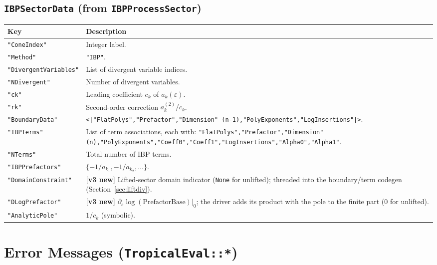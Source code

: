 \documentclass[11pt,a4paper]{article}
\begin{document}
\subsection{\texttt{IBPSectorData} (from \texttt{IBPProcessSector})}
\begin{center}
\begin{tabular}{lp{9cm}}
\toprule
\textbf{Key} & \textbf{Description} \\
\midrule
\texttt{"ConeIndex"} & Integer label. \\
\texttt{"Method"} & \texttt{"IBP"}. \\
\texttt{"DivergentVariables"} & List of divergent variable indices. \\
\texttt{"NDivergent"} & Number of divergent variables. \\
\texttt{"ck"} & Leading coefficient $c_k$ of $a_k(\varepsilon)$. \\
\texttt{"rk"} & Second-order correction $a_k^{(2)}/c_k$. \\
\texttt{"BoundaryData"} & \texttt{<|"FlatPolys","Prefactor","Dimension"\,(n{-}1),"PolyExponents","LogInsertions"|>}. \\
\texttt{"IBPTerms"} & List of term associations, each with: \texttt{"FlatPolys","Prefactor","Dimension"\,(n),"PolyExponents","Coeff0","Coeff1","LogInsertions","Alpha0","Alpha1"}. \\
\texttt{"NTerms"} & Total number of IBP terms. \\
\texttt{"IBPPrefactors"} & $\{-1/a_{k_1},-1/a_{k_2},\ldots\}$. \\
\texttt{"DomainConstraint"} & \textbf{[v3 new]} Lifted-sector domain indicator (\texttt{None} for unlifted); threaded into the boundary/term codegen (Section~\ref{sec:liftdiv}). \\
\texttt{"DLogPrefactor"} & \textbf{[v3 new]} $\partial_\varepsilon\log(\text{PrefactorBase})|_0$; the driver adds its product with the pole to the finite part ($0$ for unlifted). \\
\texttt{"AnalyticPole"} & $1/c_k$ (symbolic). \\
\bottomrule
\end{tabular}
\end{center}

\section{Error Messages (\texttt{TropicalEval::*})}
\end{document}
